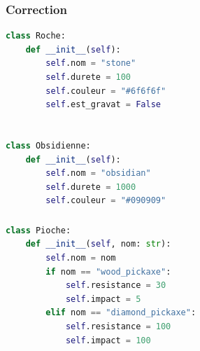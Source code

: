 \documentclass[svgnames,11pt]{beamer}
\begin{document}
\begin{frame}[fragile]
    \frametitle{Correction}

\begin{center}
\begin{lstlisting}[language=Python , basicstyle=\small, xleftmargin=2em, xrightmargin=2em]
class Roche:
    def __init__(self):
        self.nom = "stone"
        self.durete = 100
        self.couleur = "#6f6f6f"
        self.est_gravat = False


class Obsidienne:
    def __init__(self):
        self.nom = "obsidian"
        self.durete = 1000
        self.couleur = "#090909"
\end{lstlisting}
\end{center}    

\end{frame}
\begin{frame}[fragile]
    \frametitle{}    
    \begin{center}
    \begin{lstlisting}[language=Python , basicstyle=\small, xleftmargin=2em, xrightmargin=2em]
class Pioche:
    def __init__(self, nom: str):
        self.nom = nom
        if nom == "wood_pickaxe":
            self.resistance = 30
            self.impact = 5
        elif nom == "diamond_pickaxe":
            self.resistance = 100
            self.impact = 100
\end{lstlisting}
    \label{CODE}
    \end{center}
\end{frame}
\end{document}
